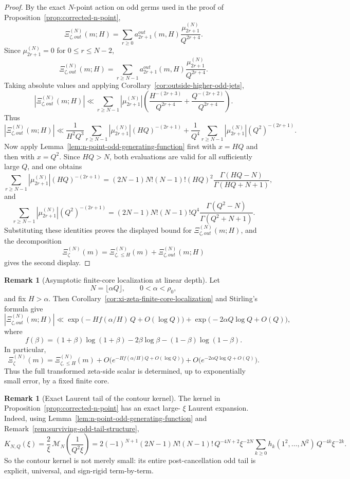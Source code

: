 \documentclass[11pt,a4paper]{amsart}
\def\out{out}%
\theoremstyle{plain}
\theoremstyle{definition}
\newtheorem{remark}[theorem]{Remark}
\newcommand{\out}{\mathrm{out}}
\begin{document}
\begin{proof}
By the exact $N$-point action on odd germs used in the proof of
Proposition~\ref{prop:corrected-n-point},
\[
\Xi_{\zeta,\out}^{(N)}(m;H)
=
\sum_{r\ge 0} a_{2r+1}^{\out}(m,H)\frac{\mu_{2r+1}^{(N)}}{Q^{2r+4}}.
\]
Since $\mu_{2r+1}^{(N)}=0$ for $0\le r\le N-2$,
\[
\Xi_{\zeta,\out}^{(N)}(m;H)
=
\sum_{r\ge N-1} a_{2r+1}^{\out}(m,H)\frac{\mu_{2r+1}^{(N)}}{Q^{2r+4}}.
\]
Taking absolute values and applying
Corollary~\ref{cor:outside-higher-odd-jets},
\[
|\Xi_{\zeta,\out}^{(N)}(m;H)|
\ll
\sum_{r\ge N-1}
|\mu_{2r+1}^{(N)}|
\left(
\frac{H^{-(2r+3)}}{Q^{2r+4}}
+
\frac{Q^{-(2r+2)}}{Q^{2r+4}}
\right).
\]
Thus
\[
|\Xi_{\zeta,\out}^{(N)}(m;H)|
\ll
\frac{1}{H^2Q^3}
\sum_{r\ge N-1}
|\mu_{2r+1}^{(N)}|(HQ)^{-(2r+1)}
+
\frac{1}{Q^4}
\sum_{r\ge N-1}
|\mu_{2r+1}^{(N)}|(Q^2)^{-(2r+1)}.
\]
Now apply Lemma~\ref{lem:n-point-odd-generating-function} first with
$x=HQ$ and then with $x=Q^2$. Since $HQ>N$, both evaluations are valid
for all sufficiently large $Q$, and one obtains
\[
\sum_{r\ge N-1}
|\mu_{2r+1}^{(N)}|(HQ)^{-(2r+1)}
=
(2N-1)N!(N-1)!(HQ)^2
\frac{\Gamma(HQ-N)}{\Gamma(HQ+N+1)},
\]
and
\[
\sum_{r\ge N-1}
|\mu_{2r+1}^{(N)}|(Q^2)^{-(2r+1)}
=
(2N-1)N!(N-1)!Q^4
\frac{\Gamma(Q^2-N)}{\Gamma(Q^2+N+1)}.
\]
Substituting these identities proves the displayed bound for
$\Xi_{\zeta,\out}^{(N)}(m;H)$, and the decomposition
\[
\Xi_\zeta^{(N)}(m)=\Xi_{\zeta,\le H}^{(N)}(m)+\Xi_{\zeta,\out}^{(N)}(m;H)
\]
gives the second display.
\end{proof}

\begin{remark}[Asymptotic finite-core localization at linear depth]
\label{rem:xi-zeta-finite-core-localization-asymptotic}
Let
\[
N=\lfloor \alpha Q\rfloor,
\qquad
0<\alpha<\rho_0,
\]
and fix $H>\alpha$. Then Corollary~\ref{cor:xi-zeta-finite-core-localization}
and Stirling's formula give
\[
|\Xi_{\zeta,\out}^{(N)}(m;H)|
\ll
\exp\!\bigl(-H f(\alpha/H)\,Q+O(\log Q)\bigr)
+
\exp\!\bigl(-2\alpha Q\log Q+O(Q)\bigr),
\]
where
\[
f(\beta)
=
(1+\beta)\log(1+\beta)-2\beta\log\beta-(1-\beta)\log(1-\beta).
\]
In particular,
\[
\Xi_\zeta^{(N)}(m)
=
\Xi_{\zeta,\le H}^{(N)}(m)
+
O\!\bigl(e^{-Hf(\alpha/H)Q+O(\log Q)}\bigr)
+
O\!\bigl(e^{-2\alpha Q\log Q+O(Q)}\bigr).
\]
Thus the full transformed zeta-side scalar is determined, up to exponentially
small error, by a fixed finite core.
\end{remark}

\begin{remark}[Exact Laurent tail of the contour kernel]
\label{rem:n-point-kernel-laurent-tail}
The kernel in Proposition~\ref{prop:corrected-n-point} has an exact large-
$\xi$ Laurent expansion. Indeed, using
Lemma~\ref{lem:n-point-odd-generating-function} and
Remark~\ref{rem:surviving-odd-tail-structure},
\[
K_{N,Q}(\xi)
=
\frac{2}{\xi}\,
\mathcal M_N\!\left(\frac{1}{Q^2\xi}\right)
=
2(-1)^{N+1}(2N-1)N!(N-1)!\,
Q^{-4N+2}\xi^{-2N}
\sum_{k\ge 0}
h_k(1^2,\dots,N^2)\,
Q^{-4k}\xi^{-2k}.
\]
So the contour kernel is not merely small: its entire post-cancellation odd
tail is explicit, universal, and sign-rigid term-by-term.
\end{remark}
\end{document}
